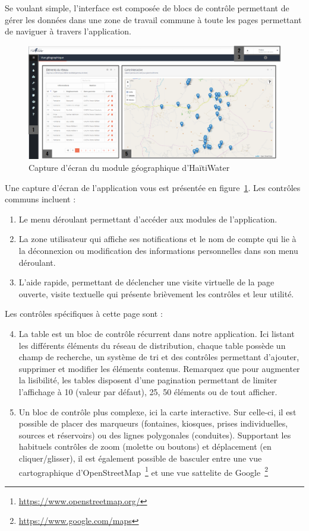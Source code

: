 \documentclass{EPL-master-thesis-covers-FR}
\begin{document}
			Se voulant simple, l'interface est composée de blocs de contrôle permettant de gérer les données dans une zone de travail commune à toute les pages permettant de naviguer à travers l'application.

			\begin{figure}[H]
				\includegraphics[width=\textwidth]{images/screen_gis_numbered.png}
				\caption{Capture d'écran du module géographique d'HaïtiWater}
				\label{fig:capture_gis}
			\end{figure}

			Une capture d'écran de l'application vous est présentée en figure~\ref{fig:capture_gis}. Les contrôles communs incluent :
			\begin{enumerate}
				\item Le menu déroulant permettant d'accéder aux modules de l'application.
				\item La zone utilisateur qui affiche ses notifications et le nom de compte qui lie à la déconnexion ou modification des informations personnelles dans son menu déroulant.
				\item L'aide rapide, permettant de déclencher une visite virtuelle de la page ouverte, visite textuelle qui présente brièvement les contrôles et leur utilité.
			\end{enumerate}

			Les contrôles spécifiques à cette page sont :
			\begin{enumerate}\setcounter{enumi}{3} %
				\item La table est un bloc de contrôle récurrent dans notre application. Ici listant les différents éléments du réseau de distribution, chaque table possède un champ de recherche, un système de tri et des contrôles permettant d'ajouter, supprimer et modifier les éléments contenus. Remarquez que pour augmenter la lisibilité, les tables disposent d'une pagination permettant de limiter l'affichage à 10 (valeur par défaut), 25, 50 éléments ou de tout afficher.
				\item Un bloc de contrôle plus complexe, ici la carte interactive. Sur celle-ci, il est possible de placer des marqueurs (fontaines, kiosques, prises individuelles, sources et réservoirs) ou des lignes polygonales (conduites). Supportant les habituels contrôles de zoom (molette ou boutons) et déplacement (en cliquer/glisser), il est également possible de basculer entre une vue cartographique d'OpenStreetMap~\footnote{\url{https://www.openstreetmap.org/}} et une vue sattelite de Google~\footnote{\url{https://www.google.com/maps}}
			\end{enumerate}
\end{document}
